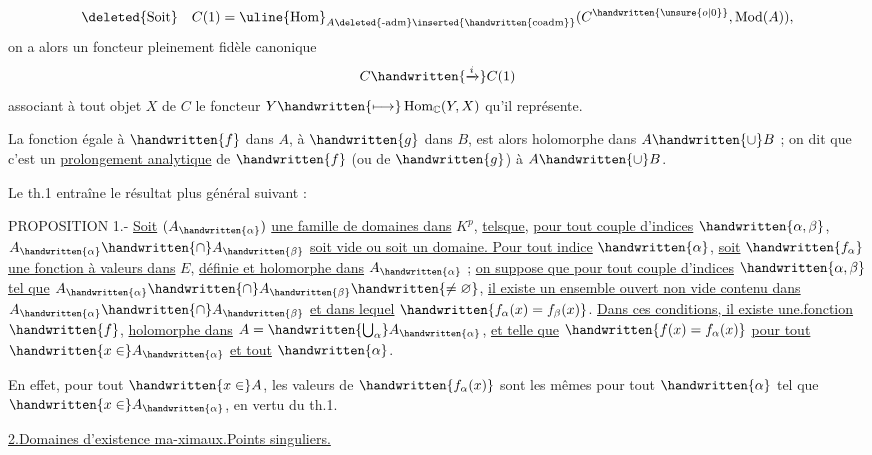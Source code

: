 \[
\deleted{\text{Soit}}\quad C(1)=\uline{\operatorname{Hom}}_{A\deleted{\text{-}\mathrm{adm}}\inserted{\handwritten{\mathrm{coadm}}}}(C^{\handwritten{\unsure{o|0}}},\operatorname{Mod}(A)),
\]
on a alors un foncteur pleinement fidèle canonique
\[
C\handwritten{\xrightarrow{i}}C(1)
\]
associant à tout objet $X$ de $C$ le foncteur $Y\handwritten{\longmapsto}\operatorname{Hom}_{\mathbb{C}}(Y,X)$ qu'il représente. 

La fonction égale à $\handwritten{f}$ dans $A$, à $\handwritten{g}$ dans $B$, est alors holomorphe dans $A\handwritten{\cup}B$ ; on dit que c'est un \uline{prolongement analytique} de $\handwritten{f}$ (ou de $\handwritten{g}$) à $A\handwritten{\cup}B$.

Le th.1 entraîne le résultat plus général suivant :

PROPOSITION 1.- \uline{Soit} $(A_{\handwritten{\alpha}})$ \uline{une famille de domaines dans} $K^p$, \uline{telsque}, \uline{pour tout couple d'indices} $\handwritten{\alpha,\beta}$, $A_{\handwritten{\alpha}}\handwritten{\cap}A_{\handwritten{\beta}}$ \uline{soit vide ou soit un domaine. Pour tout indice} $\handwritten{\alpha}$, \uline{soit} $\handwritten{f_\alpha}$ \uline{une fonction à valeurs dans} $E$, \uline{définie et holomorphe dans} $A_{\handwritten{\alpha}}$ ; \uline{on suppose que pour tout couple d'indices} $\handwritten{\alpha,\beta}$ \uline{tel que} $A_{\handwritten{\alpha}}\handwritten{\cap}A_{\handwritten{\beta}}\handwritten{\neq\varnothing}$, \uline{il existe un ensemble ouvert non vide contenu dans} $A_{\handwritten{\alpha}}\handwritten{\cap}A_{\handwritten{\beta}}$ \uline{et dans lequel} $\handwritten{f_\alpha(x)=f_\beta(x)}$. \uline{Dans ces conditions, il existe une.fonction} $\handwritten{f}$, \uline{holomorphe dans} $A=\handwritten{\bigcup_\alpha}A_{\handwritten{\alpha}}$, \uline{et telle que} $\handwritten{f(x)=f_\alpha(x)}$ \uline{pour tout} $\handwritten{x\in}A_{\handwritten{\alpha}}$ \uline{et tout} $\handwritten{\alpha}$.

En effet, pour tout $\handwritten{x\in}A$, les valeurs de $\handwritten{f_\alpha(x)}$ sont les mêmes pour tout $\handwritten{\alpha}$ tel que $\handwritten{x\in}A_{\handwritten{\alpha}}$, en vertu du th.1.

\uline{2.}\quad \uline{Domaines d'existence ma-ximaux.}\quad \uline{Points singuliers.}

